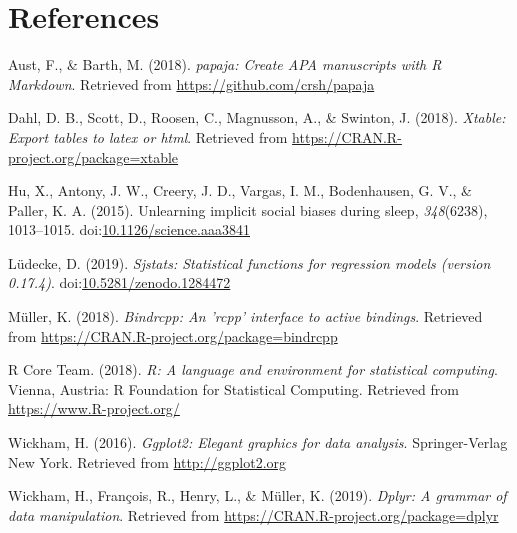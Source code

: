 \documentclass[man,floatsintext]{apa6}
\begin{document}
\newpage

\section{References}\label{references}

\begingroup
\setlength{\parindent}{-0.5in} \setlength{\leftskip}{0.5in}

\hypertarget{refs}{}
\hypertarget{ref-R-papaja}{}
Aust, F., \& Barth, M. (2018). \emph{papaja: Create APA manuscripts with
R Markdown}. Retrieved from \url{https://github.com/crsh/papaja}

\hypertarget{ref-R-xtable}{}
Dahl, D. B., Scott, D., Roosen, C., Magnusson, A., \& Swinton, J.
(2018). \emph{Xtable: Export tables to latex or html}. Retrieved from
\url{https://CRAN.R-project.org/package=xtable}

\hypertarget{ref-Hu1013}{}
Hu, X., Antony, J. W., Creery, J. D., Vargas, I. M., Bodenhausen, G. V.,
\& Paller, K. A. (2015). Unlearning implicit social biases during sleep,
\emph{348}(6238), 1013--1015.
doi:\href{https://doi.org/10.1126/science.aaa3841}{10.1126/science.aaa3841}

\hypertarget{ref-R-sjstats}{}
Lüdecke, D. (2019). \emph{Sjstats: Statistical functions for regression
models (version 0.17.4)}.
doi:\href{https://doi.org/10.5281/zenodo.1284472}{10.5281/zenodo.1284472}

\hypertarget{ref-R-bindrcpp}{}
Müller, K. (2018). \emph{Bindrcpp: An 'rcpp' interface to active
bindings}. Retrieved from
\url{https://CRAN.R-project.org/package=bindrcpp}

\hypertarget{ref-R-base}{}
R Core Team. (2018). \emph{R: A language and environment for statistical
computing}. Vienna, Austria: R Foundation for Statistical Computing.
Retrieved from \url{https://www.R-project.org/}

\hypertarget{ref-R-ggplot2}{}
Wickham, H. (2016). \emph{Ggplot2: Elegant graphics for data analysis}.
Springer-Verlag New York. Retrieved from \url{http://ggplot2.org}

\hypertarget{ref-R-dplyr}{}
Wickham, H., François, R., Henry, L., \& Müller, K. (2019). \emph{Dplyr:
A grammar of data manipulation}. Retrieved from
\url{https://CRAN.R-project.org/package=dplyr}

\endgroup
\end{document}
